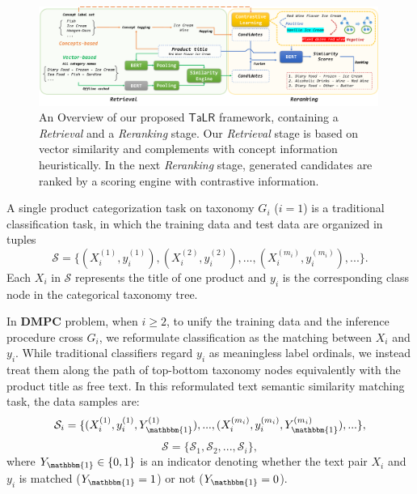 \begin{figure}[thbp] \centering
    \includegraphics[width=0.99\textwidth]{aaai_fig2}
    \caption{An Overview of our proposed $\mathsf{TaLR}$ framework, containing a \textit{Retrieval} and a \textit{Reranking} stage. Our \textit{Retrieval} stage is based on vector similarity and complements with concept information heuristically. In the next \textit{Reranking} stage, generated candidates are ranked by a scoring engine with contrastive information.}
    \label{fig:pipeline}
\end{figure}

A single product categorization task on taxonomy $G_i$ ($i=1$) is a traditional classification task, in which the training data and test data are organized in tuples 
$$
\mathcal{S}=\{(X_i^{(1)}, y_i^{(1)}), (X_i^{(2)}, y_i^{(2)}),...,(X_i^{(m_i)}, y_i^{(m_i)}),...\}.
$$
Each $X_i$ in $\mathcal{S}$ represents the title of one product and $y_i$ is the corresponding class node in the categorical taxonomy tree.

In $\mathbf{DMPC}$ problem, when $i \geq 2$, to unify the training data and the inference procedure cross $G_i$, 
we reformulate classification as the matching between $X_i$ and $y_i$. 
While traditional classifiers regard $y_i$ as meaningless label ordinals, we instead treat them along the path of top-bottom taxonomy nodes equivalently with the product title as free text. 
In this reformulated text semantic similarity matching task, the data samples are:
$$
\mathcal{S}_i=\{(X_i^{(1)}, y_i^{(1)}, Y_{\mathbbm{1}}^{(1)}),...,(X_i^{(m_i)}, y_i^{(m_i)}, Y_{\mathbbm{1}}^{(m_i)}),...\},
$$
$$
\mathcal{S}=\{\mathcal{S}_1, \mathcal{S}_2,...,\mathcal{S}_i\},
$$
where $Y_{\mathbbm{1}}\in \{0, 1\}$ is an indicator denoting whether the text pair $X_i$ and $y_i$ is matched ($Y_{\mathbbm{1}}=1$) or not ($Y_{\mathbbm{1}}=0$).

